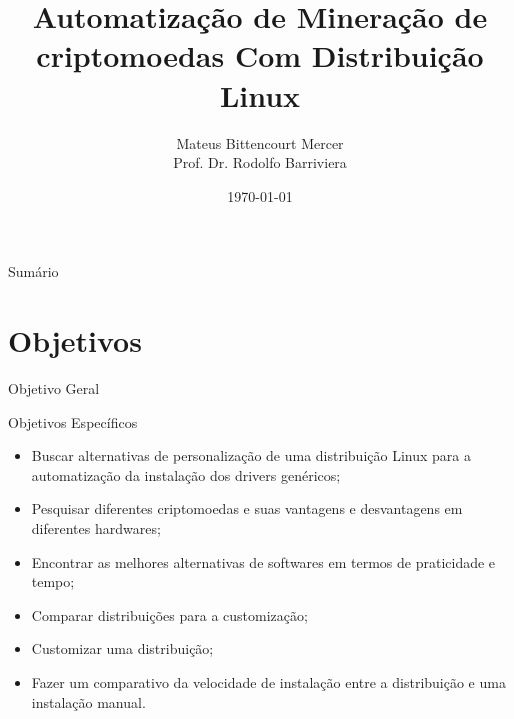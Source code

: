 \documentclass[aspectratio=43]{beamer}
\title{Automatização de Mineração de criptomoedas Com Distribuição Linux}
\author{Mateus Bittencourt Mercer \\ Prof\@. Dr\@. Rodolfo Barriviera}
\institute{Instituto Federal do Paraná Campus Londrina}
\date{\today}
\begin{document}
\begin{frame}
\titlepage
\end{frame}

\begin{frame}{Sumário}
\tableofcontents
\end{frame}

\section{Objetivos}

\begin{frame}{Objetivo Geral}

\noindent{}

\end{frame}

\begin{frame}{Objetivos Específicos}

\begin{itemize} 

    \item Buscar alternativas de personalização de uma distribuição
        Linux para a automatização da instalação dos drivers
        genéricos;

    \item Pesquisar diferentes criptomoedas e suas vantagens e
        desvantagens em diferentes hardwares;

    \item Encontrar as melhores alternativas de softwares em termos de
        praticidade e tempo;

    \item Comparar distribuições para a customização;

    \item Customizar uma distribuição;

    \item Fazer um comparativo da velocidade de instalação entre a
distribuição e uma instalação manual.

\end{itemize}
\end{frame}
\end{document}

